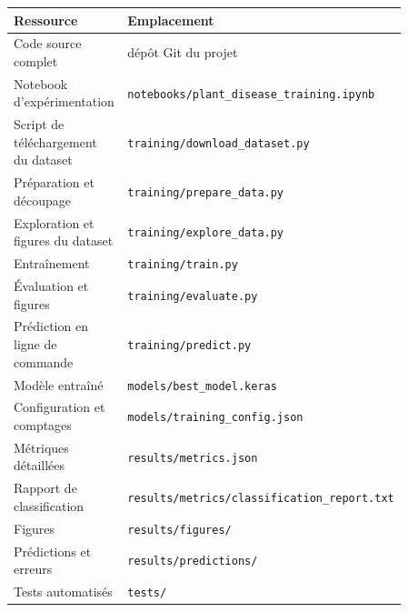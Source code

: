 \documentclass[10pt,a4paper]{article}
\begin{document}
{\footnotesize
\begin{longtable}{@{}>{\raggedright\arraybackslash}p{0.28\linewidth}>{\raggedright\arraybackslash}p{0.58\linewidth}@{}}
\toprule
\textbf{Ressource} & \textbf{Emplacement} \\
\midrule
\endhead
\bottomrule
\endlastfoot
Code source complet & dépôt Git du projet \\
Notebook d'expérimentation & \texttt{notebooks/\allowbreak{}plant\_\allowbreak{}disease\_\allowbreak{}training.ipynb} \\
Script de téléchargement du dataset & \texttt{training/\allowbreak{}download\_\allowbreak{}dataset.py} \\
Préparation et découpage & \texttt{training/\allowbreak{}prepare\_\allowbreak{}data.py} \\
Exploration et figures du dataset & \texttt{training/\allowbreak{}explore\_\allowbreak{}data.py} \\
Entraînement & \texttt{training/\allowbreak{}train.py} \\
Évaluation et figures & \texttt{training/\allowbreak{}evaluate.py} \\
Prédiction en ligne de commande & \texttt{training/\allowbreak{}predict.py} \\
Modèle entraîné & \texttt{models/\allowbreak{}best\_\allowbreak{}model.keras} \\
Configuration et comptages & \texttt{models/\allowbreak{}training\_\allowbreak{}config.json} \\
Métriques détaillées & \texttt{results/\allowbreak{}metrics.json} \\
Rapport de classification & \texttt{results/\allowbreak{}metrics/\allowbreak{}classification\_\allowbreak{}report.txt} \\
Figures & \texttt{results/\allowbreak{}figures/\allowbreak{}} \\
Prédictions et erreurs & \texttt{results/\allowbreak{}predictions/\allowbreak{}} \\
Tests automatisés & \texttt{tests/\allowbreak{}} \\
\end{longtable}
}
\end{document}
